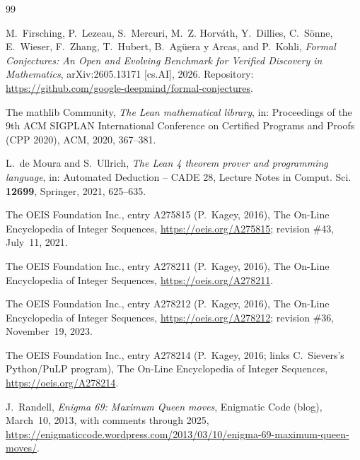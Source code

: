 \documentclass[11pt]{amsart}
\theoremstyle{plain}
\theoremstyle{definition}
\begin{document}
{\footnotesize
\begin{thebibliography}{99}

M.~Firsching, P.~Lezeau, S.~Mercuri, M.~Z. Horv\'ath, Y.~Dillies, C.~S\"onne, E.~Wieser, F.~Zhang, T.~Hubert, B.~Ag\"uera y Arcas, and P.~Kohli, \emph{Formal Conjectures: An Open and Evolving Benchmark for Verified Discovery in Mathematics}, arXiv:2605.13171 [cs.AI], 2026. Repository: \url{https://github.com/google-deepmind/formal-conjectures}.

The mathlib Community, \emph{The Lean mathematical library}, in: Proceedings of the 9th ACM SIGPLAN International Conference on Certified Programs and Proofs (CPP 2020), ACM, 2020, 367--381.

L.~de Moura and S.~Ullrich, \emph{The Lean 4 theorem prover and programming language}, in: Automated Deduction -- CADE 28, Lecture Notes in Comput. Sci. \textbf{12699}, Springer, 2021, 625--635.

The OEIS Foundation Inc., entry A275815 (P.~Kagey, 2016), The On-Line Encyclopedia of Integer Sequences, \url{https://oeis.org/A275815}; revision \#43, July~11, 2021.

The OEIS Foundation Inc., entry A278211 (P.~Kagey, 2016), The On-Line Encyclopedia of Integer Sequences, \url{https://oeis.org/A278211}.

The OEIS Foundation Inc., entry A278212 (P.~Kagey, 2016), The On-Line Encyclopedia of Integer Sequences, \url{https://oeis.org/A278212}; revision \#36, November~19, 2023.

The OEIS Foundation Inc., entry A278214 (P.~Kagey, 2016; links C.~Sievers's Python/PuLP program), The On-Line Encyclopedia of Integer Sequences, \url{https://oeis.org/A278214}.

J.~Randell, \emph{Enigma 69: Maximum Queen moves}, Enigmatic Code (blog), March~10, 2013, with comments through 2025, \url{https://enigmaticcode.wordpress.com/2013/03/10/enigma-69-maximum-queen-moves/}.

\end{thebibliography}
}
\end{document}
